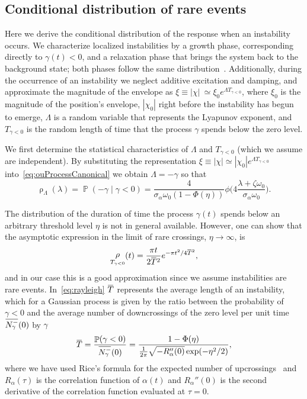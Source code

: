\documentclass[3p]{elsarticle}
\newcommand{\overbar}[1]{\mkern 1mu\overline{\mkern-1mu#1\mkern-1mu}\mkern 1mu}
\DeclareMathOperator{\prob}{\mathbb P}
\DeclareMathOperator{\pdf}{\rho}
\begin{document}
\subsection{Conditional distribution of  rare events}

Here we derive the conditional distribution of the response when an instability occurs. We characterize localized instabilities by a growth phase, corresponding directly to $\gamma(t) < 0$, and a relaxation phase that brings the system back to the background state; both phases follow the same distribution~\cite{mohamad2015}. Additionally, during the occurrence of an instability we neglect   additive excitation and   damping,   and approximate the magnitude of the envelope as  $\xi\equiv|\chi|\ \simeq \xi_0 e^{\Lambda T_{\gamma < 0}}$, where $\xi_0$ is  the magnitude of the position's envelope, $|\chi_0|$ right before the instability has begun to emerge, $\Lambda$ is a random variable that represents the Lyapunov exponent, and $T_{\gamma < 0}$ is the random length of time that the   process $\gamma$ spends below the zero level.

We first determine the statistical characteristics of $\Lambda $ and $T_{\gamma < 0}$ (which we assume are independent). By substituting  the representation $\xi\equiv|\chi| \simeq |\chi_0 |e^{\Lambda T_{\gamma < 0}}$ into~\cref{eq:ouProcessCanonical} we obtain $\Lambda = -\gamma$ so that
\begin{equation}\label{eq:growth_lambda}
    \pdf_\Lambda(\lambda) = \prob(-\gamma \mid \gamma<0)  = \frac{4}{\sigma_{\alpha}\omega_0(1 - \Phi(\eta)) } \phi\biggl(4\frac{\lambda +  \zeta \omega_0}{\sigma_{\alpha}\omega_0}\biggr).
\end{equation}

The distribution of the duration of time  the  process $ \gamma(t)$ spends below an arbitrary  threshold level $\eta$ is not in general available. However, one can show that the  asymptotic expression in the limit of rare crossings, $\eta \to \infty$, is~\cite{MR0094269}
\begin{equation}\label{eq:rayleigh}
\pdf_{T_{\gamma < 0}}(t)=\frac{\pi t}{2\overbar{T}^{2}}e^{-\pi t^2/4\overbar{T}^{2}},
\end{equation}
and in our case this is a   good approximation since we assume  instabilities are rare events. In~\cref{eq:rayleigh} $\overbar T$ represents the average length of an instability, which for a Gaussian process is given by the ratio between the probability of $\gamma < 0$ and the average number of downcrossings of the zero level per unit time $\overbar{{N}^{-}_\gamma}(0)$ by $\gamma$~\cite{MR0094269}
\begin{equation}
\overbar{T}=\frac{\prob( \gamma < 0)}{\overbar{{N}^{-}_\gamma}(0)} = \frac{ 1 - \Phi(\eta)}{ \frac{1}{2\pi}\sqrt{-R_{ \alpha}''(0)}\exp(-\eta^{2}/2) },
\end{equation}
where we have used Rice's formula for the expected number of upcrossings~\cite{MR0370729} and   $R_{\alpha}(\tau)$ is the correlation function of $\alpha(t)$ and $R_\alpha''(0)$ is the second  derivative of the correlation function evaluated at $\tau=0$.
\end{document}
